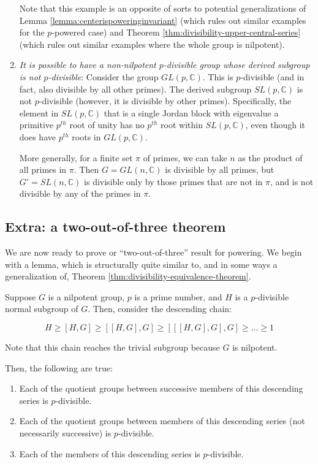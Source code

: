 \begin{enumerate}
  Note that this example is an opposite of sorts to potential
  generalizations of Lemma \ref{lemma:centerispoweringinvariant} (which
  rules out similar examples for the $p$-powered case) and Theorem
  \ref{thm:divisibility-upper-central-series} (which rules out similar
  examples where the whole group is nilpotent).

\item {\em It is possible to have a non-nilpotent $p$-divisible group
  whose derived subgroup is not $p$-divisible}: Consider the group
  $GL(p,\mathbb{C})$. This is $p$-divisible (and in fact, also
  divisible by all other primes). The derived subgroup
  $SL(p,\mathbb{C})$ is not $p$-divisible (however, it is divisible by
  other primes). Specifically, the element in $SL(p,\mathbb{C})$ that
  is a single Jordan block with eigenvalue a primitive $p^{th}$ root
  of unity has no $p^{th}$ root within $SL(p,\mathbb{C})$, even though
  it does have $p^{th}$ roots in $GL(p,\mathbb{C})$.

  More generally, for a finite set $\pi$ of primes, we can take $n$ as
  the product of all primes in $\pi$. Then $G = GL(n,\mathbb{C})$ is
  divisible by all primes, but $G' = SL(n,\mathbb{C})$ is divisible
  only by those primes that are not in $\pi$, and is not divisible by
  any of the primes in $\pi$.
\end{enumerate}

\subsection{Extra: a two-out-of-three theorem}

We are now ready to prove or ``two-out-of-three'' result for
powering. We begin with a lemma, which is structurally quite similar
to, and in some ways a generalization of, Theorem
\ref{thm:divisibility-equivalence-theorem}.

\begin{lemma}\label{lemma:lcs-subgroup-divisibility}
  Suppose $G$ is a nilpotent group, $p$ is a prime number, and $H$ is
  a $p$-divisible normal subgroup of $G$. Then, consider the
  descending chain:

  $$H \ge [H,G] \ge [[H,G],G] \ge [[[H,G],G],G] \ge \dots \ge 1$$

  Note that this chain reaches the trivial subgroup because $G$ is nilpotent.

  Then, the following are true:

  \begin{enumerate}
  \item Each of the quotient groups between successive members of this descending series is $p$-divisible.
  \item Each of the quotient groups between members of this descending
    series (not necessarily successive) is $p$-divisible.
  \item Each of the members of this descending series is $p$-divisible.
  \end{enumerate}
\end{lemma}

